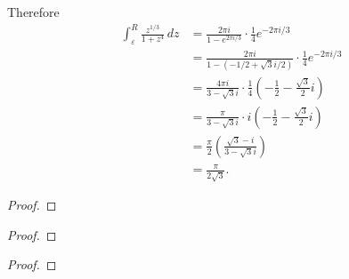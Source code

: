 \documentclass{article}
\newenvironment{problem}[2][Problem]{\begin{trivlist}
\item[\hskip \labelsep {\bfseries #1}\hskip \labelsep {\bfseries #2.}]}{\end{trivlist}}
\begin{document}
Therefore \begin{align*}
  \int_\varepsilon^R\frac{z^{1/3}}{1 + {z^4}}\,dz
  &= \frac{2\pi i}{1 - e^{2\pi i/3}}\cdot\frac{1}{4} e^{-2\pi i/3}\\
  &= \frac{2\pi i}{1 - (-1/2 + \sqrt{3}i/2)}\cdot\frac{1}{4} e^{-2\pi i/3}\\
  &= \frac{4\pi i}{3 - \sqrt{3}i} \cdot\frac{1}{4}\left(-\frac{1}{2} - \frac{\sqrt{3}}{2}i\right)\\
  &= \frac{\pi}{3 - \sqrt{3}i} \cdot i\left(-\frac{1}{2} - \frac{\sqrt{3}}{2}i\right)\\
  &= \frac{\pi}{2} \left(\frac{\sqrt3-i}{3 - \sqrt{3}i}\right)\\
  &= \frac{\pi}{2\sqrt3}.
\end{align*}
\pagebreak

\begin{problem}{2}
\end{problem}

\begin{proof}
\end{proof}

\pagebreak

\begin{problem}{3}
\end{problem}

\begin{proof}
\end{proof}

\pagebreak

\begin{problem}{4}
\end{problem}

\begin{proof}
\end{proof}
\end{document}
